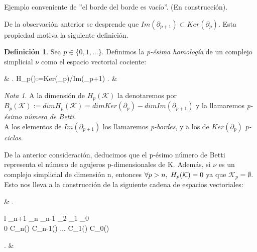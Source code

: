 \documentclass[12pt]{article}
\numberwithin{equation}{section}
\theoremstyle{definition}
\newtheorem{defi}{Definición}
\newenvironment{ejem}
  {\pushQED{\qed}\renewcommand{\qedsymbol}{$\blacktriangleleft$}\ejemplo}
  {\popQED\endejemplo}
\theoremstyle{remark}
\newtheorem*{remark}{Nota}
\theoremstyle{plain}
\begin{document}
		\begin{ejem}
		
			Ejemplo conveniente de ''el borde del borde es vacío''. (En construcción).

		\end{ejem}

		De la observación anterior se desprende que $Im(\partial_{p+1}) \subset Ker(\partial_{p})$. Esta propiedad motiva la siguiente definición.
		\begin{defi}
			Sea $p \in \{0,1,...\}$. Definimos la \textit{p-ésima homología} de un complejo simplicial {\Large $\nu$} como el espacio vectorial cociente:	
			\begin{flalign*}
				& \left.
				H_{p}():=Ker(\partial_{p})/Im(\partial_{p+1})
				\right. &
			\end{flalign*}
		\end{defi}

		\begin{remark}
			A la dimensión de $H_{p}(\mathcal{K})$ la denotaremos por $B_{p}(\mathcal{K}):=dim H_{p}(\mathcal{K})=dim Ker(\partial_{p})-dim Im(\partial_{p+1})$ y la llamaremos
			\textit{p-ésimo número de Betti}.\\
			A los elementos de $Im(\partial_{p+1})$ los llamaremos \textit{p-bordes}, y a los de $Ker(\partial_{p})$ \textit{p-ciclos}.
		\end{remark}

		De la anterior consideración, deducimos que el p-ésimo número de Betti representa el número de agujeros p-dimensionales de K. Además, si {\Large $\nu$} es un complejo simplicial
		de dimensión n, entonces $\forall p > n,\hspace{0.1cm} H_{p}(\mathcal{K})=0$ ya que $\mathcal{K}_{p}=\emptyset$. Esto nos lleva a la construcción de la siguiente cadena de 
		espacios vectoriales:
		\begin{flalign*}
			& \left.
			\begin{array}{l}
				\hspace{0.1cm} \partial_{n+1} \hspace{1.1cm} \partial_{n} \hspace{1.4cm} \partial_{n-1} \hspace{0.9cm} \partial_{2} \hspace{1.3cm} \partial_{1} \hspace{1.2cm} \partial_{0}\\
				0 \rightarrow C_{n}() \rightarrow C_{n-1}() \rightarrow \hspace{0.25cm} ... \hspace{0.25cm} \rightarrow C_{1}() \rightarrow C_{0}() \rightarrow 0
			\end{array}
			\right. &
		\end{flalign*}
\end{document}
